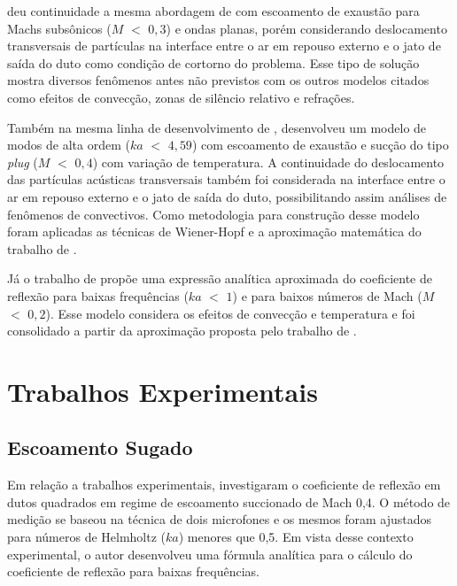 deu continuidade a mesma abordagem de  com escoamento de exaustão para Machs subsônicos ($M$ $<$ $0,3$) e ondas planas, porém considerando deslocamento transversais de partículas na interface entre o ar em repouso externo e o jato de saída do duto como condição de cortorno do problema. Esse tipo de solução mostra diversos fenômenos antes não previstos com os outros modelos citados como efeitos de convecção, zonas de silêncio relativo e refrações.

Também na mesma linha de desenvolvimento de ,  desenvolveu um modelo de modos de alta ordem ($ka$ $<$ $4,59$) com escoamento de exaustão e sucção do tipo \textit{plug} ($M$ $<$ $0,4$) com variação de temperatura. A continuidade do deslocamento das partículas acústicas transversais também foi considerada na interface entre o ar em repouso externo e o jato de saída do duto, possibilitando assim análises de fenômenos de convectivos. Como metodologia para construção desse modelo foram aplicadas as técnicas de Wiener-Hopf e a aproximação matemática do trabalho de .

Já o trabalho de  propõe uma expressão analítica aproximada do coeficiente de reflexão para baixas frequências ($ka$ $<$ $1$) e para baixos números de Mach ($M$ $<$ $0,2$). Esse modelo considera os efeitos de convecção e temperatura e foi consolidado a partir da aproximação proposta pelo trabalho de .   

\section{Trabalhos Experimentais}

\subsection{Escoamento Sugado}

Em relação a trabalhos experimentais,  investigaram o coeficiente de reflexão em dutos quadrados em regime de escoamento succionado de Mach 0,4. O método de medição se baseou na técnica de dois microfones e os mesmos foram ajustados para números de Helmholtz ($ka$) menores que 0,5. Em vista desse contexto experimental, o autor desenvolveu uma fórmula analítica para o cálculo do coeficiente de reflexão para baixas frequências.

